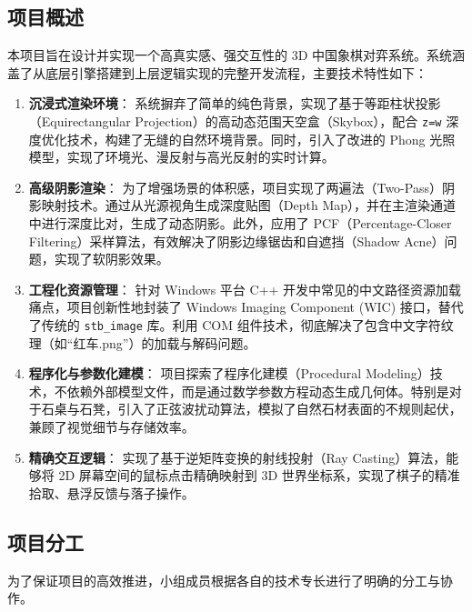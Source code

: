 \documentclass[a4paper]{article}
\begin{document}
\subsection{项目概述}
本项目旨在设计并实现一个高真实感、强交互性的 3D 中国象棋对弈系统。系统涵盖了从底层引擎搭建到上层逻辑实现的完整开发流程，主要技术特性如下：

\begin{enumerate}
    \item \textbf{沉浸式渲染环境}：
    系统摒弃了简单的纯色背景，实现了基于等距柱状投影（Equirectangular Projection）的高动态范围天空盒（Skybox），配合 \texttt{z=w} 深度优化技术，构建了无缝的自然环境背景。同时，引入了改进的 Phong 光照模型，实现了环境光、漫反射与高光反射的实时计算。
    \item \textbf{高级阴影渲染}：
    为了增强场景的体积感，项目实现了两遍法（Two-Pass）阴影映射技术。通过从光源视角生成深度贴图（Depth Map），并在主渲染通道中进行深度比对，生成了动态阴影。此外，应用了 PCF（Percentage-Closer Filtering）采样算法，有效解决了阴影边缘锯齿和自遮挡（Shadow Acne）问题，实现了软阴影效果。
    \item \textbf{工程化资源管理}：
    针对 Windows 平台 C++ 开发中常见的中文路径资源加载痛点，项目创新性地封装了 Windows Imaging Component (WIC) 接口，替代了传统的 \texttt{stb\_image} 库。利用 COM 组件技术，彻底解决了包含中文字符纹理（如“红车.png”）的加载与解码问题。
    \item \textbf{程序化与参数化建模}：
    项目探索了程序化建模（Procedural Modeling）技术，不依赖外部模型文件，而是通过数学参数方程动态生成几何体。特别是对于石桌与石凳，引入了正弦波扰动算法，模拟了自然石材表面的不规则起伏，兼顾了视觉细节与存储效率。
    \item \textbf{精确交互逻辑}：
    实现了基于逆矩阵变换的射线投射（Ray Casting）算法，能够将 2D 屏幕空间的鼠标点击精确映射到 3D 世界坐标系，实现了棋子的精准拾取、悬浮反馈与落子操作。
\end{enumerate}

\subsection{项目分工}

为了保证项目的高效推进，小组成员根据各自的技术专长进行了明确的分工与协作。
\end{document}
